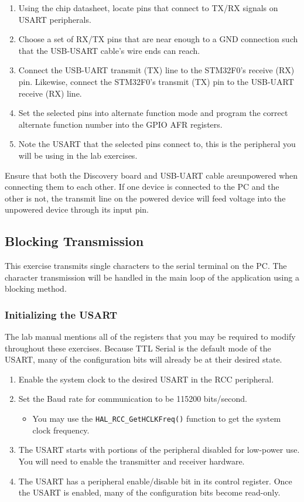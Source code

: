 \documentclass[11pt,fleqn]{book} %
\begin{document}
 \begin{enumerate}
     \item Using the chip datasheet, locate pins that connect to TX/RX signals on USART peripherals.
     \item Choose a set of RX/TX pins that are near enough to a GND connection such that the USB-USART cable's wire ends can reach. 
     \item Connect the USB-UART transmit (TX) line to the STM32F0's receive (RX) pin. Likewise, connect the  STM32F0's transmit (TX) pin to the USB-UART receive (RX) line.
     \item Set the selected pins into alternate function mode and program the correct alternate function number into the GPIO AFR registers. 
     \item Note the USART that the selected pins connect to, this is the peripheral you will be using in the lab exercises.  
 \end{enumerate}

\begin{warning}
    Ensure that both the Discovery board and USB-UART cable areunpowered when connecting them to each other. If one device is connected to the PC and the other is not, the transmit line on the powered device will feed voltage into the unpowered device through its input pin. 
\end{warning}

\subsection{Blocking Transmission}	
This exercise transmits single characters to the serial terminal on the PC. The character transmission will be handled in the main loop of the application using a blocking method. 

\subsubsection{Initializing the USART}
The lab manual mentions all of the registers that you may be required to modify throughout these exercises. Because TTL Serial is the default mode of the USART, many of the configuration bits will already be at their desired state. 

\begin{enumerate}
    \item Enable the system clock to the desired USART in the RCC peripheral.
    \item Set the Baud rate for communication to be 115200 bits/second. 
    \begin{itemize}
        \item You may use the \texttt{HAL\_RCC\_GetHCLKFreq()} function to get the system clock frequency. 
    \end{itemize}
    \item The USART starts with portions of the peripheral disabled for low-power use. You will need to enable the transmitter and receiver hardware.
    \item The USART has a peripheral enable/disable bit in its control register. Once the USART is enabled, many of the configuration bits become read-only.  
\end{enumerate}
\end{document}
